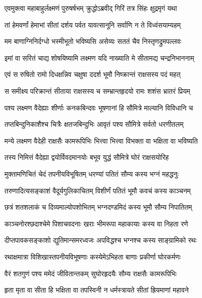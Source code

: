 \twolineshloka
{एवमुक्त्वा महाबाहुर्लक्ष्मणं पुरुषर्षभम्}
{क्रुद्धोऽब्रवीद् गिरिं तत्र सिंहः क्षुद्रमृगं यथा} %

\twolineshloka
{तां हेमवर्णां हेमाभां सीतां दर्शय पर्वत}
{यावत्सानूनि सर्वाणि न ते विध्वंसयाम्यहम्} %

\twolineshloka
{मम बाणाग्निनिर्दग्धो भस्मीभूतो भविष्यसि}
{असेव्यः सततं चैव निस्तृणद्रुमपल्लवः} %

\twolineshloka
{इमां वा सरितं चाद्य शोषयिष्यामि लक्ष्मण}
{यदि नाख्याति मे सीतामद्य चन्द्रनिभाननाम्} %

\twolineshloka
{एवं स रुषितो रामो दिधक्षन्निव चक्षुषा}
{ददर्श भूमौ निष्क्रान्तं राक्षसस्य पदं महत्} %

\twolineshloka
{स समीक्ष्य परिक्रान्तं सीताया राक्षसस्य च}
{सम्भ्रान्तहृदयो रामः शशंस भ्रातरं प्रियम्} %

\twolineshloka
{पश्य लक्ष्मण वैदेह्याः शीर्णाः कनकबिन्दवः}
{भूषणानां हि सौमित्रे माल्यानि विविधानि च} %

\twolineshloka
{तप्तबिन्दुनिकाशैश्च चित्रैः क्षतजबिन्दुभिः}
{आवृतं पश्य सौमित्रे सर्वतो धरणीतलम्} %

\twolineshloka
{मन्ये लक्ष्मण वैदेही राक्षसैः कामरूपिभिः}
{भित्त्वा भित्त्वा विभक्ता वा भक्षिता वा भविष्यति} %

\twolineshloka
{तस्य निमित्तं वैदेह्या द्वयोर्विवदमानयोः}
{बभूव युद्धं सौमित्रे घोरं राक्षसयोरिह} %

\twolineshloka
{मुक्तामणिचितं चेदं तपनीयविभूषितम्}
{धरण्यां पतितं सौम्य कस्य भग्नं महद्धनुः} %

\twolineshloka
{तरुणादित्यसङ्काशं वैदूर्यगुलिकाचितम्}
{विशीर्णं पतितं भूमौ कवचं कस्य काञ्चनम्} %

\twolineshloka
{छत्रं शतशलाकं च दिव्यमाल्योपशोभितम्}
{भग्नदण्डमिदं कस्य भूमौ सौम्य निपातितम्} %

\twolineshloka
{काञ्चनोरश्छदाश्चेमे पिशाचवदनाः खराः}
{भीमरूपा महाकायाः कस्य वा निहता रणे} %

\twolineshloka
{दीप्तपावकसङ्काशो द्युतिमान्समरध्वजः}
{अपविद्धश्च भग्नश्च कस्य साङ्ग्रामिको रथः} %

\twolineshloka
{रथाक्षमात्रा विशिखास्तपनीयविभूषणाः}
{कस्येमेऽभिहता बाणाः प्रकीर्णा घोरकर्मणः} %

\twolineshloka
{वैरं शतगुणं पश्य ममेदं जीवितान्तकम्}
{सुघोरहृदयैः सौम्य राक्षसैः कामरूपिभिः} %

\twolineshloka
{हृता मृता वा सीता हि भक्षिता वा तपस्विनी}
{न धर्मस्त्रायते सीतां ह्रियमाणां महावने} %

